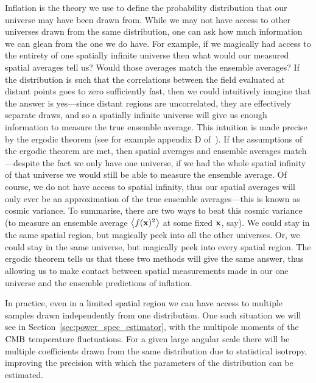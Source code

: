     Inflation is the theory we use to define the probability distribution
    that our universe may have been drawn from.
    While we may not have access to other universes drawn from the same distribution,
    one can ask how much information we can glean from the one we do have.
    For example, if we magically had access to the entirety of one spatially
    infinite universe then what would our measured spatial averages tell us?
    Would those averages match the ensemble averages?
    If the distribution is such that the correlations between the field evaluated at distant
    points goes to zero sufficiently fast, then we could intuitively imagine that the answer is
    yes---since distant regions are uncorrelated, they are effectively separate draws, and
    so a spatially infinite universe will give us enough information to measure the true
    ensemble average. This intuition is made precise by the ergodic theorem
    (see for example appendix D of~\cite{Weinberg_cosmo}).
    If the assumptions of the ergodic theorem are met,
    then spatial averages and ensemble averages
    match---despite the fact we only have one universe,
    if we had the whole spatial infinity of that universe
    we would still be able to measure the ensemble average.
    Of course, we do not have access to spatial infinity,
    thus our spatial averages will only ever be an approximation of the
    true ensemble averages---this is known as cosmic variance.
    To summarise,
    there are two ways to beat this cosmic variance (to measure an ensemble
    average $\left<f(\mathbf{x})^2\right>$ at some fixed $\mathbf{x}$, say).
    We could stay in the same spatial region, but magically peek into all the other universes.
    Or, we could stay in the same universe, but magically peek into every spatial region.
    The ergodic theorem tells us that these two methods will give the same answer,
    thus allowing us to make contact between spatial measurements made in
    our one universe and the ensemble predictions of inflation.


    In practice,
    even in a limited spatial region we can have access to multiple
    samples drawn independently from one distribution. One such situation
    we will see in Section~\ref{sec:power_spec_estimator},
    with the multipole moments of the $\text{CMB}$ temperature fluctuations.
    For a given large angular scale there will be multiple coefficients
    drawn from the same distribution due to statistical isotropy,
    improving the precision with which the parameters of the
    distribution can be estimated.


